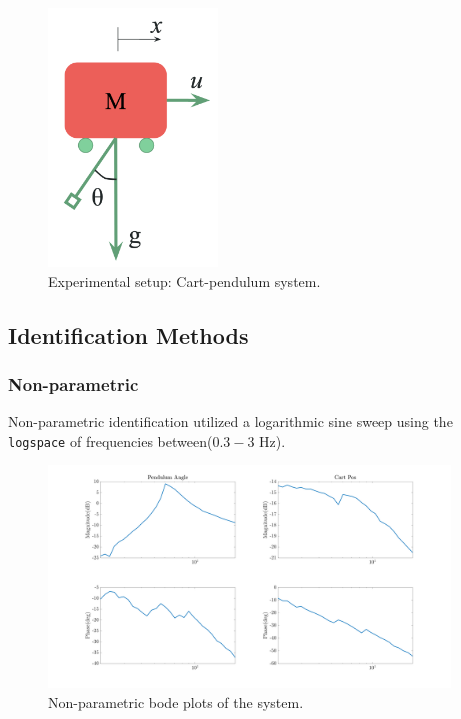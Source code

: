 \documentclass[12pt]{article}
\begin{document}
\begin{figure}[H]
    \centering
    \includegraphics[width=0.4\textwidth]{figures/system_setup.png}
    \caption{Experimental setup: Cart-pendulum system.}
    \label{fig:setup}
\end{figure}

\subsection{Identification Methods}

\subsubsection{Non-parametric}

Non-parametric identification utilized a logarithmic sine sweep using the \texttt{logspace} of frequencies between($0.3-3$ Hz). 
\begin{figure}[H]
    \centering
    \includegraphics[width=0.95\textwidth]{figures/non-para.png}
    \caption{Non-parametric bode plots of the system.}
    \label{fig:non-para}
\end{figure}
\end{document}
